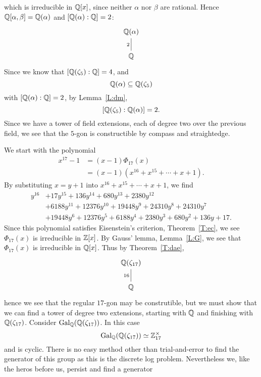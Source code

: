 \documentclass{ximera}
\begin{document}
\begin{example}
\[  \]
  which is irreducible in $\mathbb Q[x]$, since neither $\alpha$ nor $\beta$
  are rational. Hence $\mathbb Q[\alpha,\beta]= \mathbb Q(\alpha)$ and
  $[\mathbb Q(\alpha):\mathbb Q] = 2$:
  \[
  \begin{tikzcd}
    \Q(\alpha) \\ \Q \ar[u,-,"2"]
  \end{tikzcd}
  \]
  Since we know that $[\mathbb Q(\zeta_{5}):\mathbb Q] = 4$, and
  \[
  \mathbb Q(\alpha)\subseteq \mathbb Q(\zeta_{5})
  \]
  with $[\mathbb Q(\alpha):\mathbb Q]=2$, by Lemma~\ref{L:dm},
  \[
    [\mathbb Q(\zeta_{5}):\mathbb Q(\alpha)]=2.
  \]
  Since we have a tower of field extensions, each of degree two over
  the previous field, we see that the $5$-gon is constructible by
  compass and straightedge.
\end{example}

\begin{example}
  We start with the polynomial
  \begin{align*}
    x^{17} -1 &= (x-1) \Phi_{17}(x)\\
    &= (x-1)(x^{16} + x^{15} + \cdots + x+1).
  \end{align*}
  By substituting $x=y+1$ into $x^{16} + x^{15} + \cdots + x+1$, we find
  \begin{align*}
  y^{16} &+17 y^{15}+136 y^{14}+680 y^{13}+2380 y^{12} \\
  &+6188 y^{11}+12376 y^{10}+19448 y^9+24310 y^8+24310 y^7\\
  &+19448 y^6+12376 y^5+6188 y^4+2380 y^3+680 y^2+136 y+17.
  \end{align*}
  Since this polynomial satisfies Eisenstein's criterion,
  Theorem~\ref{T:ec}, we see $\Phi_{17}(x)$ is irreducible in
  $\mathbb Z[x]$. By Gauss' lemma, Lemma~\ref{L:G}, we see that $\Phi_{17}(x)$ is irreducible in
  $\mathbb Q[x]$. Thus by Theorem~\ref{T:dae}, 
  \[
  \begin{tikzcd}
    \Q(\zeta_{17})\\
    \Q\ar[u, -, "16"]
  \end{tikzcd}
  \]
  hence we see that the regular $17$-gon may be construtible, but we
  must show that we can find a tower of degree two extensions,
  starting with $\mathbb Q$ and finishing with $\mathbb Q(\zeta_{17})$.  Consider
  $\operatorname{Gal}_{\mathbb Q}(\mathbb Q(\zeta_{17}))$. In this case
  \[
  \operatorname{Gal}_{\mathbb Q}(\mathbb Q(\zeta_{17}))\simeq \mathbb Z_{17}^\times
  \]
  and is cyclic. There is no easy method other than trial-and-error to
  find the generator of this group as this is the discrete log
  problem. Nevertheless we, like the
  heros before us, persist and find a generator

\end{example}
\end{document}
